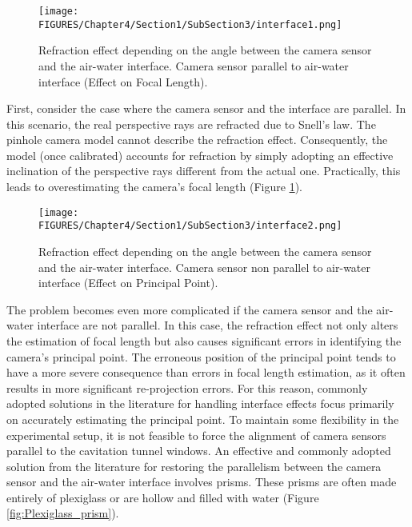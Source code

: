 \begin{figure}[htbp]
  \centering
  \texttt{[image: FIGURES/Chapter4/Section1/SubSection3/interface1.png]}
  \caption{Refraction effect depending on the angle between the camera sensor and the air-water interface. Camera sensor parallel to air-water interface (Effect on Focal Length).}
  \label{fig:focal_length_effect}
\end{figure}

First, consider the case where the camera sensor and the interface are parallel. In this scenario, the real perspective rays are refracted due to Snell's law. The pinhole camera model cannot describe the refraction effect. Consequently, the model (once calibrated) accounts for refraction by simply adopting an effective inclination of the perspective rays different from the actual one. Practically, this leads to overestimating the camera's focal length (Figure \ref{fig:focal_length_effect}).

\begin{figure}[htbp]
  \centering
  \texttt{[image: FIGURES/Chapter4/Section1/SubSection3/interface2.png]}
  \caption{Refraction effect depending on the angle between the camera sensor and the air-water interface. Camera sensor non parallel to air-water interface (Effect on Principal Point).}
  \label{fig:optical_centre_effect}
\end{figure}

The problem becomes even more complicated if the camera sensor and the air-water interface are not parallel. In this case, the refraction effect not only alters the estimation of focal length but also causes significant errors in identifying the camera's principal point.
The erroneous position of the principal point tends to have a more severe consequence than errors in focal length estimation, as it often results in more significant re-projection errors. For this reason, commonly adopted solutions in the literature for handling interface effects focus primarily on accurately estimating the principal point.
To maintain some flexibility in the experimental setup, it is not feasible to force the alignment of camera sensors parallel to the cavitation tunnel windows. An effective and commonly adopted solution from the literature for restoring the parallelism between the camera sensor and the air-water interface involves prisms. These prisms are often made entirely of plexiglass or are hollow and filled with water (Figure \ref{fig:Plexiglass_prism}).

